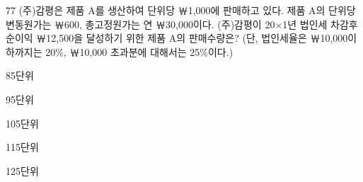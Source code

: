 \begin{question}{77}
(주)감평은 제품 A를 생산하여 단위당 ￦1,000에 판매하고 있다. 제품 A의 단위당 변동원가는 ￦600, 총고정원가는 연 ￦30,000이다. (주)감평이 20×1년 법인세 차감후 순이익 ￦12,500을 달성하기 위한 제품 A의 판매수량은? (단, 법인세율은 ￦10,000이하까지는 20\%, ￦10,000 초과분에 대해서는 25\%이다.)
\begin{choices}
  \item 85단위
  \item 95단위
  \item 105단위
  \item 115단위
  \item 125단위
\end{choices}
\end{question}
